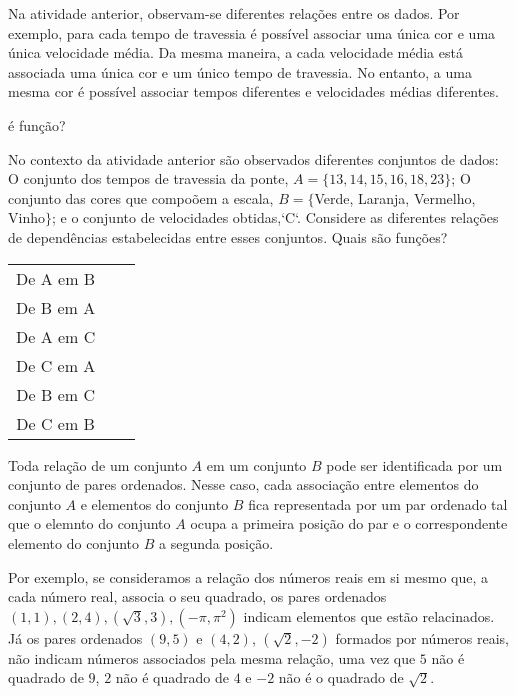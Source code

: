 \documentclass[extrafontsizes, twoside, 11pt, openright, final]{memoir}
\begin{document}
Na atividade anterior, observam-se diferentes relações entre os dados. Por exemplo, para cada tempo de travessia é possível associar uma única cor e uma única velocidade média. Da mesma maneira, a cada velocidade média está associada uma única cor e um único tempo de travessia. No entanto, a uma mesma cor é possível associar tempos diferentes e velocidades médias diferentes.

\begin{task}{ é função?}
	\label{\detokenize{AF106-2:atividade-e-funcao}}\label{\detokenize{AF106-2:ativ-funcoes-e-funcao}}

	No contexto da atividade anterior são observados diferentes conjuntos de dados: O conjunto dos tempos de travessia da ponte, $A=\{13, 14, 15, 16, 18, 23\}$; O conjunto das cores que compoõem a escala, $B=\{$Verde, Laranja, Vermelho, Vinho$\}$; e o conjunto de velocidades obtidas,{}`C{}`. Considere as diferentes relações de dependências estabelecidas entre esses conjuntos. Quais são funções?

	\begin{table}[H]
		\centering
		\begin{tabular}{|c|c|>{\centering}m{6cm}<{\arraybackslash}|}
			\hline
			\hline
			\tcolor{Relação} & \tcolor{É função?} & \tcolor{Se não, por que?} \tabularnewline
			\hline
			De A em B
			                 &                    & \tabularnewline
			\hline
			De B em A
			                 &                    & \tabularnewline
			\hline
			De A em C
			                 &                    & \tabularnewline
			\hline
			De C em A
			                 &                    & \tabularnewline
			\hline
			De B em C
			                 &                    & \tabularnewline
			\hline
			De C em B
			                 &                    & \tabularnewline
			\hline
		\end{tabular}
	\end{table}
\end{task}

Toda relação de um conjunto $A$ em um conjunto $B$ pode ser identificada por um conjunto de pares ordenados. Nesse caso, cada associação entre elementos do conjunto $A$ e elementos do conjunto $B$ fica representada por um par ordenado tal que o elemnto do conjunto $A$ ocupa a primeira posição do par e o correspondente elemento do conjunto $B$ a segunda posição.

Por exemplo, se consideramos a relação dos números reais em si mesmo que, a cada número real, associa o seu quadrado, os pares ordenados $(1,1), (2,4), (\sqrt{3},3), (-\pi,\pi^2)$ indicam elementos que estão relacinados. Já os pares ordenados $(9,5)$ e $(4,2)$, $(\sqrt{2},-2)$ formados por números reais, não indicam números associados pela mesma relação, uma vez que $5$ não é quadrado de $9$, $2$ não é quadrado de $4$ e $-2$ não é o quadrado de $\sqrt{2}$.
\end{document}
